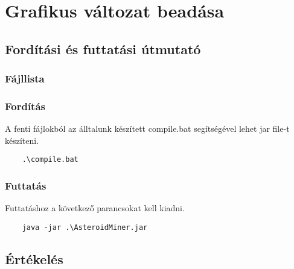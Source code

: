 \documentclass[../../projlab]{subfiles}
\begin{document}
\makeatletter


\makeatother


\chapter{Grafikus változat beadása}

\section{Fordítási és futtatási útmutató}

\subsection{Fájllista}

\begin{fajllista}
    
\end{fajllista}

\subsection{Fordítás}
A fenti fájlokból az álltalunk készített compile.bat segítségével lehet jar file-t készíteni.

\begin{verbatim}
    .\compile.bat
\end{verbatim}

\subsection{Futtatás}

Futtatáshoz a következő parancsokat kell kiadni.
\begin{verbatim}
    java -jar .\AsteroidMiner.jar
\end{verbatim}

\clearpage
\section{Értékelés}
\begin{ertekeles}
\end{ertekeles}
\end{document}
